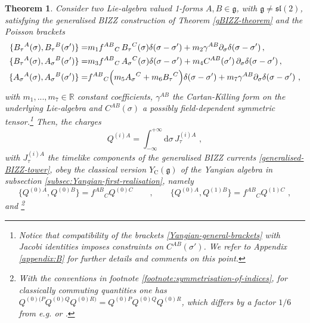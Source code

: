 \documentclass[12pt]{article}
\newtheorem{thm}{Theorem}[section]
\numberwithin{equation}{section}
\begin{document}
\begin{thm}\label{Yangian-theorem} Consider two Lie-algebra valued 1-forms $A, B \in \mathfrak{g}$, with $\mathfrak{g} \neq \mathfrak{sl} ( 2 )$, satisfying the generalised BIZZ construction of Theorem \ref{gBIZZ-theorem} and the Poisson brackets
\begin{align}\label{Yangian-general-brackets}
\{ B_{\tau}{}^{A}(\sigma),B_{\tau}{}^{B}(\sigma') \} =& m_{1}f^{AB}{}_{C} \, B_{\tau}{}^{C}(\sigma)\delta(\sigma-\sigma')+m_{2}\gamma^{AB}\partial_{\sigma}\delta(\sigma-\sigma') \, ,
\notag \\
\{ B_{\tau}{}^{A}(\sigma),A_{\sigma}{}^{B}(\sigma') \} =& m_{3}f^{AB}{}_{C} \, A_{\sigma}{}^{C}(\sigma)\delta(\sigma-\sigma')+m_{4}C^{AB}(\sigma') \, \partial_{\sigma}\delta(\sigma-\sigma') \, ,
\\
\{ A_{\sigma}{}^{A}(\sigma),A_{\sigma}{}^{B}(\sigma') \} =& f^{AB}{}_{C}\Bigl(m_{5}A_{\sigma}{}^{C}+m_{6}B_{\tau}{}^{C}\Bigr)\delta(\sigma-\sigma')+m_{7}\gamma^{AB}\partial_{\sigma}\delta(\sigma-\sigma') \,\, ,
\notag
\end{align}
with $m_{1},...,m_{7} \in \mathbb{R}$ constant coefficients, $\gamma^{AB}$ the Cartan-Killing form on the underlying Lie-algebra and $C^{AB}(\sigma)$ a possibly field-dependent symmetric tensor.\footnote{Notice that compatibility of the brackets \eqref{Yangian-general-brackets} with Jacobi identities imposes constraints on $C^{AB}(\sigma')$. We refer to Appendix \ref{appendix:B} for further details and comments on this point.
} Then, the charges 
\begin{equation}\label{Yangian-charges-def}
Q^{(i)A}=\int_{-\infty}^{+{\infty}} \mathrm{d}\sigma \,  J_{\tau}^{(i)A} \,\, ,
\end{equation}
with $J_{\tau}^{(i)A}$ the timelike components of the generalised BIZZ currents \eqref{generalised-BIZZ-tower}, obey the classical version $Y_{\text{C}}(\mathfrak{g})$ of the Yangian algebra in subsection \ref{subsec:Yangian-first-realisation}, namely
\begin{equation}\label{Yangian-general-level0-and-level1-brackets}
\{Q^{(0)A},Q^{(0)B}\}=f^{AB}{}_{C}Q^{(0)C} 
\qquad , \qquad 
\{ Q^{(0)A},Q^{(1)B}  \}=f^{AB}{}_{C}Q^{(1)C} \,\, ,
\end{equation}
and \footnote{With the conventions in footnote \ref{footnote:symmetrisation-of-indices}, for classically commuting quantities one has $Q^{(0)(P}Q^{(0)Q}Q^{(0)R)}=Q^{(0)P}Q^{(0)Q}Q^{(0)R}$, which differs by a factor $1/6$ from e.g. \cite{MacKay:1992he} or \cite{Itsios:2014vfa}.}
\begin{equation}\label{Serre-relations}

\end{equation}
\end{thm}
\end{document}
